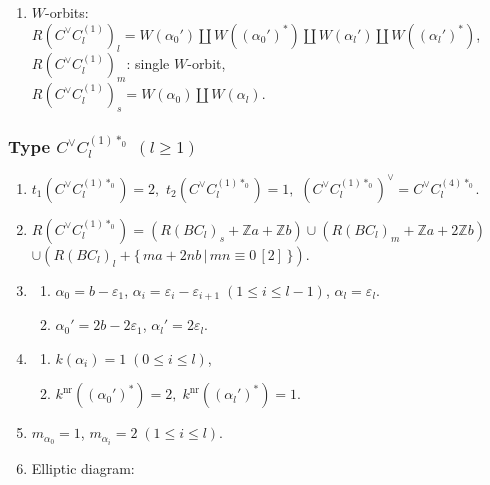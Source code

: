 \documentclass[11pt]{amsart}
\newcommand{\Z}{\mathbb{Z}}
\newcommand{\nr}{\mathrm{nr}}
\newcommand{\vep}{\varepsilon}
\begin{document}
{\begin{enumerate}
\begin{center}
{}
\end{center}
\item $W$-orbits: $R(C^\vee C_l^{(1)})_l=W(\alpha_0') \amalg W((\alpha_0')^\ast)
\amalg W(\alpha_l') \amalg W((\alpha_l')^\ast)$, \\
\phantom{$W$-orbits:}
$R(C^\vee C_l^{(1)})_m$: single $W$-orbit, \\
\phantom{$W$-orbits:}
$R(C^\vee C_l^{(1)})_s=W(\alpha_0) \amalg W(\alpha_l)$.
\end{enumerate}

\subsubsection{Type $C^\vee C_l^{(1)\ast_0}$ $(l\geq 1)$}\label{data:CC-2}
\begin{enumerate}
\item $t_1(C^\vee C_l^{(1)\ast_0})=2,$ \quad $t_2(C^\vee C_l^{(1)\ast_0})=1,$ \quad 
$(C^\vee C_l^{(1)\ast_0})^\vee = C^\vee C_l^{(4)\ast_0}.$
\item $R(C^\vee C_l^{(1)\ast_0})=(R(BC_l)_s+\Z a+\Z b) \cup 
(R(BC_l)_m+\Z a+2\Z b)$ \\
$\cup (R(BC_l)_l+\{ \,ma+2nb\, \vert\, mn \equiv 0\, [2]\,\})$. 
\item 
\begin{enumerate}
\item[i)] $\alpha_0=b-\vep_1$, $\alpha_i=\vep_i-\vep_{i+1}\; 
(1\leq i\leq l-1)$, $\alpha_l=\vep_l$. 
\item[ii)] $\alpha_0'=2b-2\vep_1$, \; $\alpha_l'=2\vep_l$.
\end{enumerate}
\item 
\begin{enumerate}
\item[i)] $k(\alpha_i)=1\; (0\leq i\leq l)$, 
\item[ii)] $k^{\nr}((\alpha_0')^\ast)=2, \; k^{\nr}((\alpha_l')^\ast)=1$. 
\end{enumerate}
\item $m_{\alpha_0}=1$, \; $m_{\alpha_i}=2\; (1\leq i \leq l)$. 
\item Elliptic diagram: 





\end{enumerate}}
\end{document}

